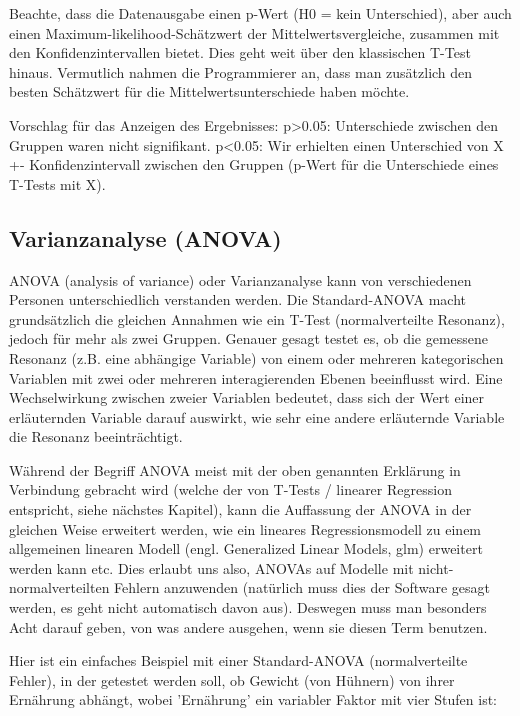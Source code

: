 \documentclass[a4paper,twoside]{tufte-book}\usepackage[]{graphicx}\usepackage[]{color}
\begin{document}
Beachte, dass die Datenausgabe einen p-Wert (H0 = kein Unterschied), aber auch einen Maximum-likelihood-Schätzwert der Mittelwertsvergleiche, zusammen mit den Konfidenzintervallen bietet. Dies geht weit über den klassischen T-Test hinaus. Vermutlich nahmen die Programmierer an, dass man zusätzlich den besten Schätzwert für die Mittelwertsunterschiede haben möchte.

Vorschlag für das Anzeigen des Ergebnisses: p>0.05: Unterschiede zwischen den Gruppen waren nicht signifikant. p<0.05: Wir erhielten einen Unterschied von X +- Konfidenzintervall zwischen den Gruppen (p-Wert für die Unterschiede eines T-Tests mit X). 

\subsection{Varianzanalyse (ANOVA)}

ANOVA (analysis of variance) oder Varianzanalyse kann von verschiedenen Personen unterschiedlich verstanden werden. Die Standard-ANOVA macht grundsätzlich die gleichen Annahmen wie ein T-Test (normalverteilte Resonanz), jedoch für mehr als zwei Gruppen. Genauer gesagt testet es, ob die gemessene Resonanz (z.B. eine abhängige Variable) von einem oder mehreren kategorischen Variablen mit zwei oder mehreren interagierenden Ebenen beeinflusst wird. Eine Wechselwirkung zwischen zweier Variablen bedeutet, dass sich der Wert einer erläuternden Variable darauf auswirkt, wie sehr eine andere erläuternde Variable die Resonanz beeinträchtigt.

Während der Begriff ANOVA meist mit der oben genannten Erklärung in Verbindung gebracht wird (welche der von T-Tests / linearer Regression entspricht, siehe nächstes Kapitel), kann die Auffassung der ANOVA in der gleichen Weise erweitert werden, wie ein lineares Regressionsmodell zu einem allgemeinen linearen Modell (engl. Generalized Linear Models, glm) erweitert werden kann etc. Dies erlaubt uns also, ANOVAs auf Modelle mit nicht-normalverteilten Fehlern anzuwenden (natürlich muss dies der Software gesagt werden, es geht nicht automatisch davon aus). Deswegen muss man besonders Acht darauf geben, von was andere ausgehen, wenn sie diesen Term benutzen.

Hier ist ein einfaches Beispiel mit einer Standard-ANOVA (normalverteilte Fehler), in der getestet werden soll, ob Gewicht (von Hühnern) von ihrer Ernährung abhängt, wobei 'Ernährung' ein variabler Faktor mit vier Stufen ist:
\end{document}
